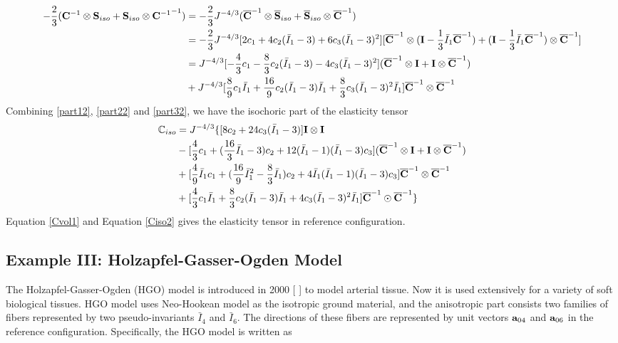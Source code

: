 \begin{equation} \label{part32}
\begin{split}
-\frac{2}{3}({\bold{C}}^{-1} \otimes {\bold{S}}_{iso} + {\bold{S}}_{iso} \otimes {{\bold{C}}^{-1}}^{-1}) 
&= 
-\frac{2}{3}J^{-4/3}({\overline{\bold{C}}}^{-1} \otimes {\overline{\bold{S}}}_{iso} + {\overline{\bold{S}}}_{iso} \otimes {\overline{{\bold{C}}}^{-1}}) \\
&=
-\frac{2}{3}J^{-4/3}[2c_1 + 4c_2({\bar{I}}_1 - 3) + 6c_3({\bar{I}}_1 - 3)^2]
[{\overline{\bold{C}}}^{-1} \otimes (\bold{I} - \frac{1}{3}{\bar{I}_1}{\overline{\bold{C}}}^{-1}) + 
(\bold{I} - \frac{1}{3}{\bar{I}_1}{\overline{\bold{C}}}^{-1}) \otimes {\overline{\bold{C}}}^{-1}]\\
&=
J^{-4/3}  [-\frac{4}{3}c_1 - \frac{8}{3}c_2({\bar{I}}_1 - 3) - 4c_3({\bar{I}}_1 - 3)^2] ({\overline{\bold{C}}}^{-1} \otimes \bold{I} + \bold{I} \otimes {\overline{\bold{C}}}^{-1}) \\
&+ J^{-4/3}  [\frac{8}{9}c_1{\bar{I}}_1 + \frac{16}{9}c_2({\bar{I}}_1 - 3){\bar{I}}_1 + \frac{8}{3}c_3({\bar{I}}_1 - 3)^2{\bar{I}}_1 ] {\overline{\bold{C}}}^{-1} \otimes {\overline{\bold{C}}}^{-1}
\end{split}
\end{equation}
Combining \ref{part12}, \ref{part22} and \ref{part32}, we have the isochoric part of the elasticity tensor
\begin{equation} \label{Ciso2}
\begin{split}
{\mathbb{C}}_{iso} &= J^{-4/3} \{
[8c_2+24c_3({\bar{I}}_1 - 3)] \bold{I} \otimes \bold{I} \\
&- [\frac{4}{3}c_1 + (\frac{16}{3}{\bar{I}}_1 - 3)c_2 + 12({\bar{I}}_1 - 1)({\bar{I}}_1 - 3)c_3]({\overline{\bold{C}}}^{-1} \otimes \bold{I} + \bold{I} \otimes {\overline{\bold{C}}}^{-1})\\
&+ [\frac{4}{9}{\bar{I}}_1c_1 + (\frac{16}{9}{{\bar{I}}_1}^2 - \frac{8}{3}{\bar{I}}_1)c_2 + 4{\bar{I}}_1({\bar{I}}_1 - 1)({\bar{I}}_1 - 3)c_3] {\overline{\bold{C}}}^{-1} \otimes {\overline{\bold{C}}}^{-1} \\
&+ [\frac{4}{3}c_1{\bar{I}}_1 + \frac{8}{3}c_2({\bar{I}}_1 - 3){\bar{I}}_1 + 4c_3({\bar{I}}_1 - 3)^2{\bar{I}}_1]{\overline{\bold{C}}}^{-1} \odot {\overline{\bold{C}}}^{-1}
\}
\end{split}
\end{equation}
Equation \ref{Cvol1} and Equation \ref{Ciso2} gives the elasticity tensor in reference configuration.


%
\subsection{Example III: Holzapfel-Gasser-Ogden Model}
The Holzapfel-Gasser-Ogden (HGO) model is introduced in 2000 [ ] to model arterial tissue. Now it is used extensively for a variety of soft biological tissues. HGO model uses Neo-Hookean model as the isotropic ground material, and the anisotropic part consists two families of fibers represented by two pseudo-invariants $\bar{I}_4$ and $\bar{I}_6$. The directions of these fibers are represented by unit vectors $\bold{a}_{04}$ and $\bold{a}_{06}$ in the reference configuration. Specifically, the HGO model is written as

